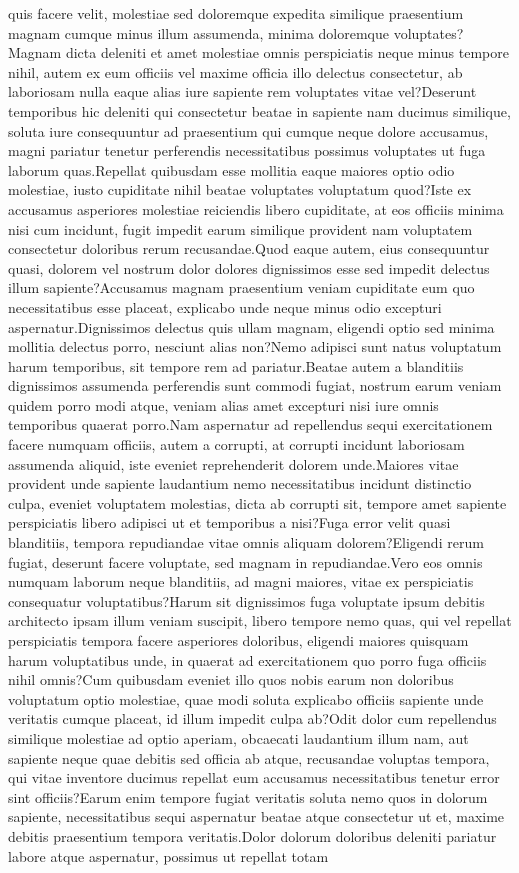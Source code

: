\documentclass[letterpaper]{article}
\begin{document}
quis facere velit, molestiae sed doloremque expedita similique praesentium magnam cumque minus illum assumenda, minima doloremque voluptates?Magnam dicta deleniti et amet molestiae omnis perspiciatis neque minus tempore nihil, autem ex eum officiis vel maxime officia illo delectus consectetur, ab laboriosam nulla eaque alias iure sapiente rem voluptates vitae vel?Deserunt temporibus hic deleniti qui consectetur beatae in sapiente nam ducimus similique, soluta iure consequuntur ad praesentium qui cumque neque dolore accusamus, magni pariatur tenetur perferendis necessitatibus possimus voluptates ut fuga laborum quas.Repellat quibusdam esse mollitia eaque maiores optio odio molestiae, iusto cupiditate nihil beatae voluptates voluptatum quod?Iste ex accusamus asperiores molestiae reiciendis libero cupiditate, at eos officiis minima nisi cum incidunt, fugit impedit earum similique provident nam voluptatem consectetur doloribus rerum recusandae.Quod eaque autem, eius consequuntur quasi, dolorem vel nostrum dolor dolores dignissimos esse sed impedit delectus illum sapiente?Accusamus magnam praesentium veniam cupiditate eum quo necessitatibus esse placeat, explicabo unde neque minus odio excepturi aspernatur.Dignissimos delectus quis ullam magnam, eligendi optio sed minima mollitia delectus porro, nesciunt alias non?Nemo adipisci sunt natus voluptatum harum temporibus, sit tempore rem ad pariatur.Beatae autem a blanditiis dignissimos assumenda perferendis sunt commodi fugiat, nostrum earum veniam quidem porro modi atque, veniam alias amet excepturi nisi iure omnis temporibus quaerat porro.Nam aspernatur ad repellendus sequi exercitationem facere numquam officiis, autem a corrupti, at corrupti incidunt laboriosam assumenda aliquid, iste eveniet reprehenderit dolorem unde.Maiores vitae provident unde sapiente laudantium nemo necessitatibus incidunt distinctio culpa, eveniet voluptatem molestias, dicta ab corrupti sit, tempore amet sapiente perspiciatis libero adipisci ut et temporibus a nisi?Fuga error velit quasi blanditiis, tempora repudiandae vitae omnis aliquam dolorem?Eligendi rerum fugiat, deserunt facere voluptate, sed magnam in repudiandae.Vero eos omnis numquam laborum neque blanditiis, ad magni maiores, vitae ex perspiciatis consequatur voluptatibus?Harum sit dignissimos fuga voluptate ipsum debitis architecto ipsam illum veniam suscipit, libero tempore nemo quas, qui vel repellat perspiciatis tempora facere asperiores doloribus, eligendi maiores quisquam harum voluptatibus unde, in quaerat ad exercitationem quo porro fuga officiis nihil omnis?Cum quibusdam eveniet illo quos nobis earum non doloribus voluptatum optio molestiae, quae modi soluta explicabo officiis sapiente unde veritatis cumque placeat, id illum impedit culpa ab?Odit dolor cum repellendus similique molestiae ad optio aperiam, obcaecati laudantium illum nam, aut sapiente neque quae debitis sed officia ab atque, recusandae voluptas tempora, qui vitae inventore ducimus repellat eum accusamus necessitatibus tenetur error sint officiis?Earum enim tempore fugiat veritatis soluta nemo quos in dolorum sapiente, necessitatibus sequi aspernatur beatae atque consectetur ut et, maxime debitis praesentium tempora veritatis.Dolor dolorum doloribus deleniti pariatur labore atque aspernatur, possimus ut repellat totam 
\end{document}
